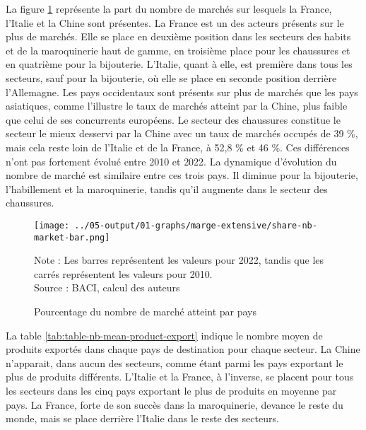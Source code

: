 \documentclass[french,10pt,a4paper]{article}
\begin{document}
\bigskip

La figure \ref{fig:nb-market-bar} représente la part du nombre de marchés sur lesquels la France, l'Italie et la Chine sont présentes. La France est un des acteurs présents sur le plus de marchés. Elle se place en deuxième position dans les secteurs des habits et de la maroquinerie haut de gamme, en troisième place pour les chaussures et en quatrième pour la bijouterie. L'Italie, quant à elle, est première dans tous les secteurs, sauf pour la bijouterie, où elle se place en seconde position derrière l'Allemagne. Les pays occidentaux sont présents sur plus de marchés que les pays asiatiques, comme l'illustre le taux de marchés atteint par la Chine, plus faible que celui de ses concurrents européens. Le secteur des chaussures constitue le secteur le mieux desservi par la Chine avec un taux de marchés occupés de 39 \%, mais cela reste loin de l'Italie et de la France, à 52,8 \% et 46 \%. Ces différences n'ont pas fortement évolué entre 2010 et 2022. La dynamique d'évolution du nombre de marché est similaire entre ces trois pays. Il diminue pour la bijouterie, l'habillement et la maroquinerie, tandis qu'il augmente dans le secteur des chaussures.

\begin{figure}[!h]
  \centering
  \texttt{[image: ../05-output/01-graphs/marge-extensive/share-nb-market-bar.png]}
  \captionsetup{justification=justified, singlelinecheck=false, font=small}
  \caption*{Note : Les barres représentent les valeurs pour 2022, tandis que les carrés représentent les valeurs pour 2010. \\
  Source : BACI, calcul des auteurs}
  \captionsetup{justification=centering, singlelinecheck=true, font=normalsize}
  \caption{Pourcentage du nombre de marché atteint par pays}
  \label{fig:nb-market-bar}
\end{figure}

La table \ref{tab:table-nb-mean-product-export} indique le nombre moyen de produits exportés dans chaque pays de destination pour chaque secteur. La Chine n'apparait, dans aucun des secteurs, comme étant parmi les pays exportant le plus de produits différents. L'Italie et la France, à l'inverse, se placent pour tous les secteurs dans les cinq pays exportant le plus de produits en moyenne par pays. La France, forte de son succès dans la maroquinerie, devance le reste du monde, mais se place derrière l'Italie dans le reste des secteurs.
\end{document}
